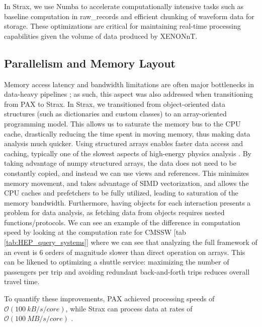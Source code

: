 In Strax, we use Numba to accelerate computationally intensive tasks such as baseline computation in raw\_records and efficient chunking of waveform data for storage. These optimizations are critical for maintaining real-time processing capabilities given the volume of data produced by XENONnT.

\subsection*{Parallelism and Memory Layout}

Memory access latency and bandwidth limitations are often major bottlenecks in data-heavy pipelines \cite{memory_wall1995}; as such, this aspect was also addressed when transitioning from PAX to Strax. In Strax, we transitioned from object-oriented data structures (such as dictionaries and custom classes) to an array-oriented programming model. This allows us to saturate the memory bus to the CPU cache, drastically reducing the time spent in moving memory, thus making data analysis much quicker. Using structured arrays enables faster data access and caching, typically one of the slowest aspects of high-energy physics analysis \cite{Pivarski_2018}. By taking advantage of numpy structured arrays, the data does not need to be constantly copied, and instead we can use views and references. This minimizes memory movement, and takes advantage of SIMD vectorization, and allows the CPU caches and prefetchers to be fully utilized, leading to saturation of the memory bandwidth.  Furthermore, having objects for each interaction presents a problem for data analysis, as fetching data from objects requires nested functions/protocols. We can see an example of the difference in computation speed by looking at the computation rate for CMSSW [tab \ref{tab:HEP_query_systems}] where we can see that analyzing the full framework of an event is 6 orders of magnitude slower than direct operation on arrays. This can be likened to optimizing a shuttle service: maximizing the number of passengers per trip and avoiding redundant back-and-forth trips reduces overall travel time. 

To quantify these improvements, PAX achieved processing speeds of $\mathcal{O} (\SI{100}{kB/s/core})$, while Strax can process data at rates of $\mathcal{O} (\SI{100}{MB/s/core})$ \cite{tda_Aprile_2023}.

